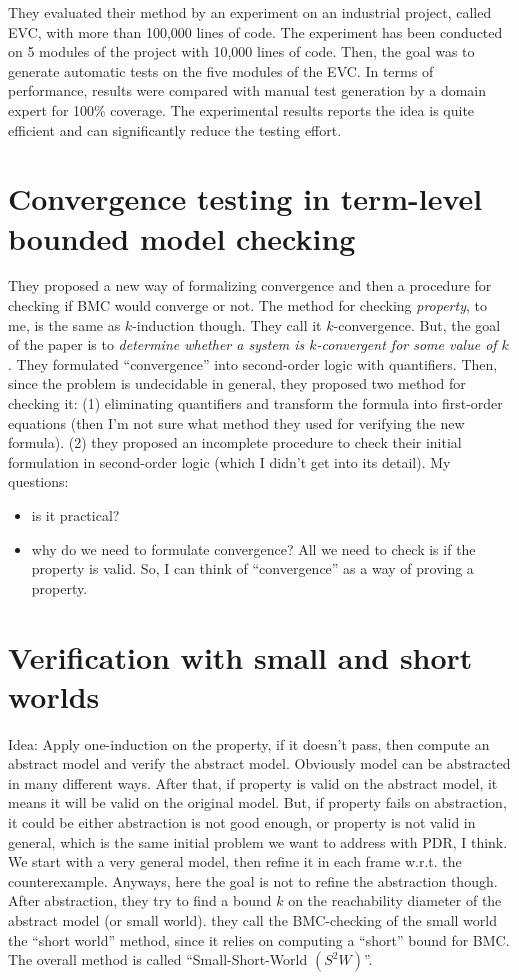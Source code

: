 They evaluated their method by an experiment on an industrial project, called EVC, with more than 100,000 lines of code. The experiment has been conducted on 5 modules of the project with 10,000 lines of code.  Then, the goal was to generate automatic
tests on the five modules of the EVC.
In terms of performance, results were compared
with manual test generation by a domain expert for 100\% coverage. The experimental results reports the idea is quite efficient and
can significantly reduce the testing effort.

\section{Convergence testing in term-level bounded model checking \cite{bryant2003convergence}}
They proposed a new way of formalizing convergence and
then a procedure for checking if BMC would converge or not.
The method for checking \emph{property}, to me, is the same as $k$-induction though.
They call it $k$-convergence. But, the goal of the paper is to \emph{determine whether a system is $k$-convergent for some
value of $k$}. They formulated ``convergence'' into second-order logic with quantifiers.
Then, since the problem is undecidable in general, they proposed two method for checking it:
(1) eliminating quantifiers and transform the formula into
first-order equations (then I'm not sure what method they used for verifying the new formula).
(2) they proposed an incomplete procedure to check their initial formulation in second-order logic (which I didn't get into its detail).
\linebreak
\linebreak
My questions:
\begin{itemize}
  \item is it practical?
  \item why do we need to formulate convergence?
  All we need to check is if the property is valid.
  So, I can think of ``convergence'' as a way of proving a property.
\end{itemize}

\section{Verification with small and short worlds \cite{sinha2012verification}}
Idea: Apply one-induction on the property, if it doesn't pass,
then compute an abstract model and verify the abstract model.
Obviously model can be abstracted in many different ways. After that, if property is valid on the abstract model, it means it will be valid on the original model. But, if property fails on abstraction, it could be either abstraction is not good enough, or property is not valid in general, which is the same initial problem we want to address with PDR, I think. We start with a very general model, then refine it in each frame w.r.t. the counterexample. Anyways, here the goal is not to refine the abstraction though. After abstraction, they  try  to  find  a  bound
$k$ on  the  reachability  diameter  of  the abstract model (or  small  world).
they call the BMC-checking of the small world the
``short world'' method, since it relies on computing a ``short''
bound  for  BMC.   The overall method is called ``Small-Short-World $(S^2W)$''.

